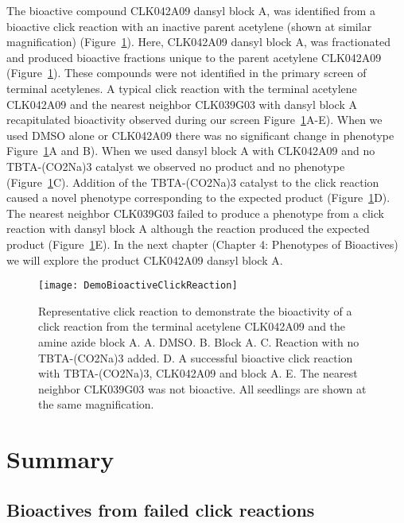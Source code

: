The bioactive compound CLK042A09 dansyl block A, was identified from a bioactive click reaction with an inactive parent acetylene (shown at similar magnification) (Figure~\ref{fig:DemoBioactiveClickReaction}). Here, CLK042A09 dansyl block A,  was fractionated and produced bioactive fractions unique to the parent acetylene CLK042A09 (Figure~\ref{fig:DemoBioactiveClickReaction}). These compounds were not identified in the primary screen of terminal acetylenes. A typical click reaction with the terminal acetylene CLK042A09 and the nearest neighbor CLK039G03 with dansyl block A recapitulated bioactivity observed during our screen Figure~\ref{fig:DemoBioactiveClickReaction}A-E). When we used DMSO alone or CLK042A09 there was no significant change in phenotype Figure~\ref{fig:DemoBioactiveClickReaction}A and B). When we used dansyl block A with CLK042A09 and no TBTA-(CO2Na)3 catalyst we observed no product and no phenotype (Figure~\ref{fig:DemoBioactiveClickReaction}C). Addition of the TBTA-(CO2Na)3 catalyst to the click reaction caused a novel phenotype corresponding to the expected product (Figure~\ref{fig:DemoBioactiveClickReaction}D). The nearest neighbor CLK039G03 failed to produce a phenotype from a click reaction with dansyl block A although the reaction produced the expected product (Figure~\ref{fig:DemoBioactiveClickReaction}E). In the next chapter (Chapter 4: Phenotypes of Bioactives) we will explore the product CLK042A09 dansyl block A.  

\begin{figure}
\texttt{[image: DemoBioactiveClickReaction]}
\caption{Representative click reaction to demonstrate the bioactivity of a click reaction from the terminal acetylene CLK042A09 and the amine azide block A. A. DMSO. B. Block A. C. Reaction with no TBTA-(CO2Na)3 added. D. A successful bioactive click reaction with TBTA-(CO2Na)3, CLK042A09 and block A. E. The nearest neighbor CLK039G03 was not bioactive. All seedlings are shown at the same magnification.}
\label{fig:DemoBioactiveClickReaction}
\end{figure}



\section{Summary}

\subsection{Bioactives from failed click reactions}

